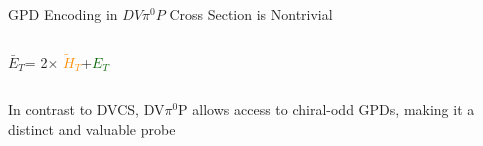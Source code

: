 \documentclass[aspectratio=169]{beamer}
\newcommand{\GPDET}{\textcolor{darkgreen}{$E_T$}}
\newcommand{\GPDHTtilde}{\textcolor{darkorange}{$\tilde{H}_T$}}
\newcommand{\GPDETbar}{\textcolor{mypurp}{$\bar{E}_T$}}
\begin{document}
\begin{frame}{GPD Encoding in  $DV\pi^0P$ Cross Section is Nontrivial}
\begin{columns}
            
                    
                \vspace{0.1cm}
                \footnotesize{\GPDETbar = 2$\times$ \GPDHTtilde+\GPDET\\}
            
        \end{columns}
    
    \vspace{0.2cm}
    
    
     \begin{columns}
            \centering
            In contrast to DVCS, DV$\pi^0$P allows access to chiral-odd GPDs, making it a distinct and valuable probe
               
    \end{columns}
               
               \vspace{0.1cm}



\end{frame}
\end{document}
